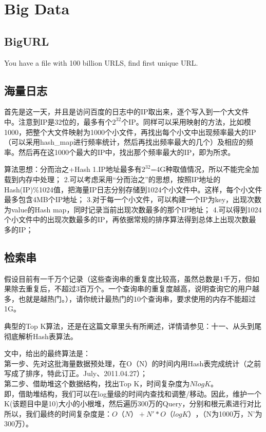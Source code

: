 \chapter{Big Data}
\section{BigURL}
You have a file with 100 billion URLS, find first unique URL.

\section{海量日志}
首先是这一天，并且是访问百度的日志中的IP取出来，逐个写入到一个大文件中。注意到IP是32位的，最多有个$2^32$个IP。同样可以采用映射的方法，比如模1000，把整个大文件映射为1000个小文件，再找出每个小文中出现频率最大的IP（可以采用hash_map进行频率统计，然后再找出频率最大的几个）及相应的频率。然后再在这1000个最大的IP中，找出那个频率最大的IP，即为所求。

算法思想：分而治之+Hash
1.IP地址最多有$2^32$=4G种取值情况，所以不能完全加载到内存中处理； 
2.可以考虑采用“分而治之”的思想，按照IP地址的Hash(IP)\%1024值，把海量IP日志分别存储到1024个小文件中。这样，每个小文件最多包含4MB个IP地址； 
3.对于每一个小文件，可以构建一个IP为key，出现次数为value的Hash map，同时记录当前出现次数最多的那个IP地址；
4.可以得到1024个小文件中的出现次数最多的IP，再依据常规的排序算法得到总体上出现次数最多的IP；

\section{检索串}
假设目前有一千万个记录（这些查询串的重复度比较高，虽然总数是1千万，但如果除去重复后，不超过3百万个。一个查询串的重复度越高，说明查询它的用户越多，也就是越热门。），请你统计最热门的10个查询串，要求使用的内存不能超过1G。

典型的Top K算法，还是在这篇文章里头有所阐述，详情请参见：十一、从头到尾彻底解析Hash表算法。

文中，给出的最终算法是：\\
第一步、先对这批海量数据预处理，在O（N）的时间内用Hash表完成统计（之前写成了排序，特此订正。July、2011.04.27）；\\
第二步、借助堆这个数据结构，找出Top K，时间复杂度为$NlogK$。\\
即，借助堆结构，我们可以在log量级的时间内查找和调整/移动。因此，维护一个K(该题目中是10)大小的小根堆，然后遍历300万的Query，分别和根元素进行对比所以，我们最终的时间复杂度是：$O（N） + 
N'*O（logK）$，（N为1000万，N’为300万）。

